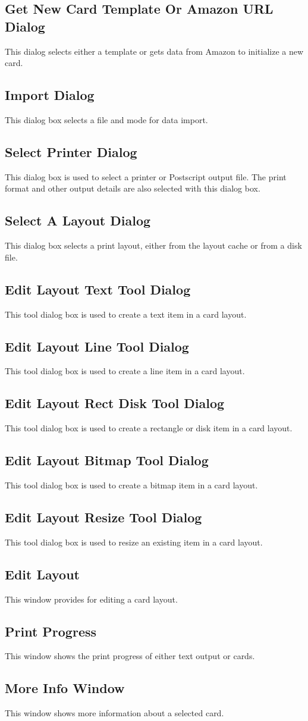 \subsection{Get New Card Template Or Amazon URL Dialog}
This dialog selects either a template or gets data from Amazon to initialize 
a new card.
\subsection{Import Dialog}
This dialog box selects a file and mode for data import.
\subsection{Select Printer Dialog}
This dialog box is used to select a printer or Postscript output file.
The print format and other output details are also selected with this
dialog box.
\subsection{Select A Layout Dialog}
This dialog box selects a print layout, either from the layout cache or
from a disk file.
\subsection{Edit Layout Text Tool Dialog}
This tool dialog box is used to create a text item in a card layout.
\subsection{Edit Layout Line Tool Dialog}
This tool dialog box is used to create a line item in a card layout.
\subsection{Edit Layout Rect Disk Tool Dialog}
This tool dialog box is used to create a rectangle or disk item in a
card layout.
\subsection{Edit Layout Bitmap Tool Dialog}
This tool dialog box is used to create a bitmap item in a card layout.
\subsection{Edit Layout Resize Tool Dialog}
This tool dialog box is used to resize an existing item in a card layout.
\subsection{Edit Layout}
This window provides for editing a card layout.
\subsection{Print Progress}
This window shows the print progress of either text output or cards.
\subsection{More Info Window}
This window shows more information about a selected card.


